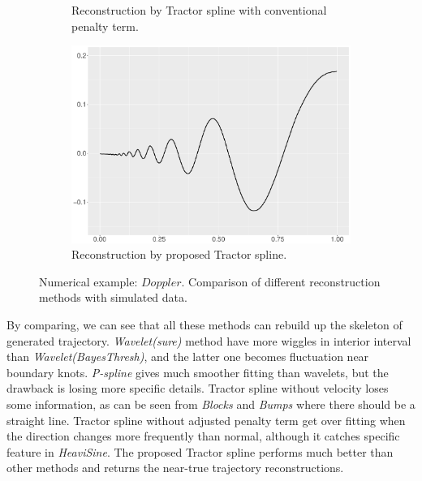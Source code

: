 \begin{figure}
\begin{subfigure}{0.45\textwidth}
    \caption{Reconstruction by Tractor spline with conventional penalty term.}
    \end{subfigure}
    \begin{subfigure}{0.45\textwidth}
    \centering
    \includegraphics[width=\linewidth,height=0.45\textwidth]{Chapters/02TractorSplineTheory/plot/ggplot/ggDopplerTractor.pdf}
    \caption{Reconstruction by proposed Tractor spline.}
    \end{subfigure}
\caption{Numerical example: $\textit{Doppler}$. Comparison of different reconstruction methods with simulated data.}\label{num4}
 \end{figure}

By comparing, we can see that all these methods can rebuild up the skeleton of generated trajectory. \textit{Wavelet(sure)} method have more wiggles in interior interval than \textit{Wavelet(BayesThresh)}, and the latter one becomes fluctuation near boundary knots. \textit{P-spline} gives much smoother fitting than wavelets, but the drawback is losing more specific details. Tractor spline without velocity loses some information, as can be seen from \textit{Blocks} and \textit{Bumps} where there should be a straight line. Tractor spline without adjusted penalty term get over fitting when the direction changes more frequently than normal, although it catches specific feature in \textit{HeaviSine}. The proposed Tractor spline performs much better than other methods and returns the near-true trajectory reconstructions.  






